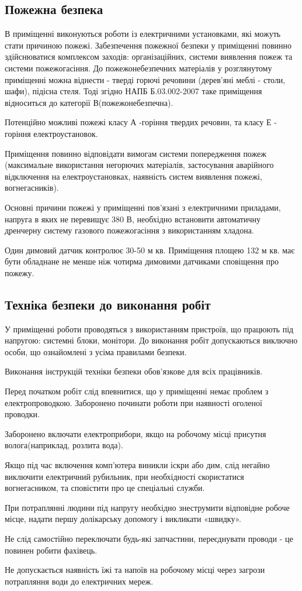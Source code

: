 \subsection{Пожежна безпека}
    В приміщенні виконуються роботи із електричними установками, які можуть стати причиною пожежі. Забезпечення пожежної безпеки у приміщенні повинно здійснюватися комплексом заходів: організаційних, системи виявлення пожеж та системи пожежогасіння.
    До пожежонебезпечних матеріалів у розглянутому приміщенні можна віднести - тверді горючі речовини (дерев'яні меблі - столи, шафи), підісна стеля. Тоді згідно НАПБ Б.03.002-2007\cite{lab-napb} таке приміщення відноситься до категорії В(пожежонебезпечна).

    Потенційно можливі пожежі класу А -горіння твердих речовин, та класу Е - горіння електроустановок.

    Приміщення повинно відповідати вимогам системи попередження пожеж (максимальне використання негорючих матеріалів, застосування аварійного відключення на електроустановках, наявність систем виявлення пожежі, вогнегасників).

    Основні причини пожежі у приміщенні пов'язані з електричними приладами, напруга в яких не перевищує 380 В, необхідно встановити автоматичну дренчерну систему газового пожежогасіння з використанням хладона.

    Один димовий датчик контролює 30-50 м кв. Приміщення площею 132 м кв. має бути обладнане не менше ніж чотирма димовими датчиками сповіщення про пожежу.

\subsection{Техніка безпеки до виконання робіт}
    У приміщенні роботи проводяться з використанням пристроїв, що працюють під напругою: системні блоки, монітори. До виконання робіт допускаються виключно особи, що ознайомлені з усіма правилами безпеки.
    
    Виконання інструкцій техніки безпеки обов'язкове для всіх працівників.

    Перед початком робіт слід впевнитися, що у приміщенні немає проблем з електропроводкою. Заборонено починати роботи при наявності оголеної проводки.
    
    Заборонено включати електроприбори, якщо на робочому місці присутня волога(наприклад, розлита вода).
    
    Якщо під час включення комп'ютера виникли іскри або дим, слід негайно виключити електричний рубильник,
    при необхідності скористатися вогнегасником, та сповістити про це спеціальні служби.

    При потраплянні людини під напругу необхідно знеструмити відповідне робоче місце, надати першу долікарську допомогу і викликати «швидку».

    Не слід самостійно переключати будь-які запчастини, переєднувати проводи - це повинен робити фахівець.

    Не допускається наявність їжі та напоїв на робочому місці через загрози потрапляння води до електричних мереж.
